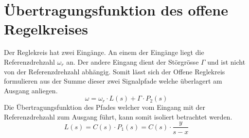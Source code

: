 \section{Übertragungsfunktion des offene Regelkreises}
Der Reglekreis hat zwei Eingänge. An einem der Eingänge liegt die
Referenzdrehzahl $\omega_r$ an. Der andere Eingang dient der Störgrösse
$\Gamma$ und ist nicht von der Referenzdrehzahl abhängig. Somit lässt
sich der Offene Reglekreis formulieren aus der Summe dieser zwei Signalpfade
welche überlagert am Ausgang anliegen.
\[
	\omega = \omega_r \cdot L(s) + \Gamma \cdot P_2(s)
\]
Die Übertragungsfunktion des Pfades welcher vom Eingang mit der Referenzdrehzahl
zum Ausgang führt, kann somit isoliert betrachtet werden.
\[
	L(s) = C(s) \cdot P_1(s) = C(s) \cdot \frac{y}{s-x}	
\]
